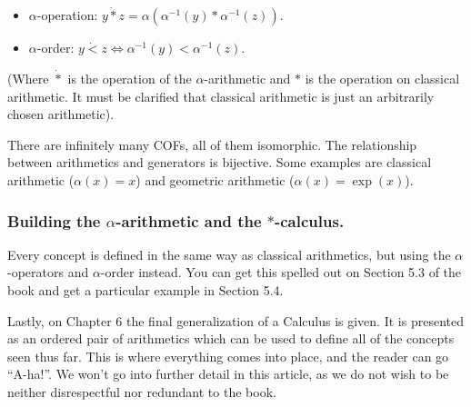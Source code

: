 \begin{itemize}
	\item $\alpha$-operation: $y \dot{*} z = \alpha(\alpha^{-1}(y) * \alpha^{-1}(z))$.
	\item $\alpha$-order: $y \dot{<} z \iff \alpha^{-1}(y) < \alpha^{-1}(z)$.
\end{itemize}

(Where $\dot{*}$ is the operation of the $\alpha$-arithmetic and $*$ is the operation on classical arithmetic. It must be clarified that classical arithmetic is just an arbitrarily chosen arithmetic).

There are infinitely many COFs, all of them isomorphic. The relationship between arithmetics and generators is bijective. Some examples are classical arithmetic ($\alpha(x) = x$) and geometric arithmetic ($\alpha(x) = \exp(x)$).

\subsubsection{Building the $\alpha$-arithmetic and the $*$-calculus.}

Every concept is defined in the same way as classical arithmetics, but using the $\alpha$-operators and $\alpha$-order instead. You can get this spelled out on Section 5.3 of the book and get a particular example in Section 5.4.

Lastly, on Chapter 6 the final generalization of a Calculus is given. It is presented as an ordered pair of arithmetics which can be used to define all of the concepts seen thus far. This is where everything comes into place, and the reader can go \enquote{A-ha!}. We won't go into further detail in this article, as we do not wish to be neither disrespectful nor redundant to the book.
